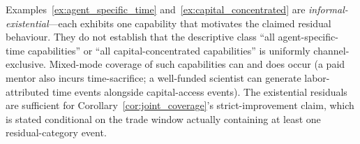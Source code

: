 \begin{remark}
\label{rem:residual_scope}
Examples~\ref{ex:agent_specific_time}
and~\ref{ex:capital_concentrated} are
\emph{informal-existential}---each exhibits one capability
that motivates the claimed residual behaviour.  They do not establish that the
descriptive class ``all agent-specific-time capabilities'' or
``all capital-concentrated capabilities'' is uniformly
channel-exclusive.  Mixed-mode coverage of such capabilities can
and does occur (a paid mentor also incurs time-sacrifice; a
well-funded scientist can generate labor-attributed time events
alongside capital-access events).  The existential residuals
are sufficient for Corollary~\ref{cor:joint_coverage}'s
strict-improvement claim, which is stated conditional on the
trade window actually containing at least one residual-category
event.
\end{remark}

